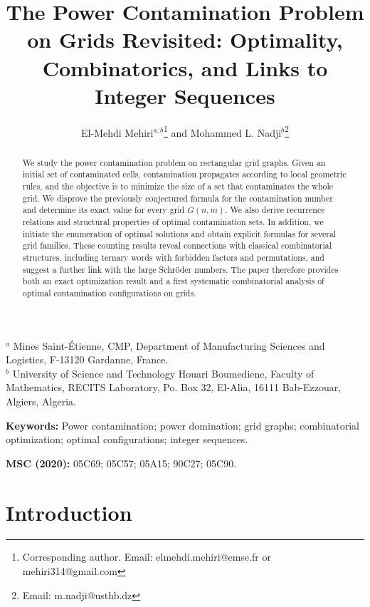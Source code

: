 \documentclass[letterpaper,12pt]{article}
\title{The Power Contamination Problem on Grids Revisited: Optimality, Combinatorics, and Links to Integer Sequences}
\author{
El-Mehdi Mehiri$^{a,b}$\footnote{Corresponding author. Email: elmehdi.mehiri@emse.fr or  mehiri314@gmail.com}  and Mohammed L. Nadji$^{b}$\footnote{Email: m.nadji@usthb.dz}
}
\date{}
\begin{document}
\maketitle
\begin{center}
{\small
$^{a}$ Mines Saint-Étienne, CMP, Department of Manufacturing Sciences and Logistics, 
F-13120 Gardanne, France. \\[4pt]
$^{b}$ University of Science and Technology Houari Boumediene, Faculty of Mathematics, RECITS Laboratory, Po. Box 32, El-Alia,
16111 Bab-Ezzouar, Algiers, Algeria.
}
\end{center}


 


\begin{abstract}
\noindent We study the power contamination problem on rectangular grid graphs. Given an initial set of contaminated cells, contamination propagates according to local geometric rules, and the objective is to minimize the size of a set that contaminates the whole grid. We disprove the previously conjectured formula for the contamination number and determine its exact value for every grid \(G(n,m)\). We also derive recurrence relations and structural properties of optimal contamination sets. In addition, we initiate the enumeration of optimal solutions and obtain explicit formulas for several grid families. These counting results reveal connections with classical combinatorial structures, including ternary words with forbidden factors and permutations, and suggest a further link with the large Schr\"oder numbers. The paper therefore provides both an exact optimization result and a first systematic combinatorial analysis of optimal contamination configurations on grids.
\end{abstract}

\medskip
\noindent\textbf{Keywords:} Power contamination; power domination; grid graphs; combinatorial optimization; optimal configurations; integer sequences.

\medskip
\noindent\textbf{MSC (2020):} 05C69; 05C57; 05A15; 90C27; 05C90.
\section{Introduction}
\end{document}
